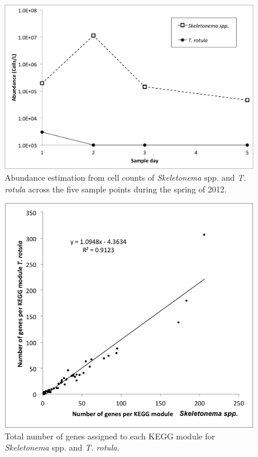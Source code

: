 \begin{figure}[h!]
  \centering
    \includegraphics[width=1\textwidth]{Images/C3_SFigure1_CellCounts.png}
    \caption[Cell counts in Narragansett Bay during the spring of 2012]{Abundance estimation from cell counts of \textit{Skeletonema} spp. and \textit{T. rotula} across the five sample points during the spring of 2012. }
  \label{fig:a3f1}
\end{figure}


\begin{figure}[p!]
  \centering
    \includegraphics[width=1\textwidth]{Images/C3_SFigure2_KEGGModuleGeneContent2.png}
    \caption[Comparison of KEGG module content between \textit{Skeletonema} spp. and \textit{T. rotula} ]{Total number of genes assigned to each KEGG module for \textit{Skeletonema} spp. and \textit{T. rotula}.}
  \label{fig:a3f2}
\end{figure}


